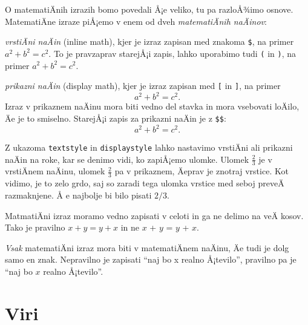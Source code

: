 \documentclass[a4paper]{article}
\begin{document}
O matematiÄnih izrazih bomo povedali Å¡e veliko, tu pa razloÅ¾imo osnove. MatematiÄne izraze
piÅ¡emo v enem od dveh \emph{matematiÄnih naÄinov}:
%
\begin{description}
\item \emph{vrstiÄni naÄin} (inline math), kjer je izraz zapisan med znakoma \texttt{\$}, na
  primer $a^2 + b^2 = c^2$. To je pravzaprav starejÅ¡i zapis, lahko uporabimo tudi
  \texttt{{}(} in \texttt{{})}, na primer \(a^2 + b^2 = c^2\).

\item \emph{prikazni naÄin} (display math), kjer je izraz zapisan med \texttt{{}[} in
  \texttt{{}]}, na primer
  \[
    a^2 + b^2 = c^2.
  \]
  Izraz v prikaznem naÄinu mora biti vedno del stavka in mora vsebovati loÄilo, Äe je to
  smiselno. StarejÅ¡i zapis za prikazni naÄin je z \texttt{\$\$}:
  $$
    a^2 + b^2 = c^2.
  $$
\end{description}

\noindent
%
Z ukazoma \texttt{{}textstyle} in \texttt{{}displaystyle} lahko nastavimo
vrstiÄni ali prikazni naÄin na roke, kar se denimo vidi, ko zapiÅ¡emo ulomke. Ulomek
$\frac{2}{3}$ je v vrstiÄnem naÄinu, ulomek $\displaystyle \frac{2}{3}$ pa v prikaznem,
Äeprav je znotraj vrstice. Kot vidimo, je to zelo grdo, saj so zaradi tega ulomka vrstice
med seboj preveÄ razmaknjene. Å e najbolje bi bilo pisati $2/3$.

MatmatiÄni izraz moramo vedno zapisati v celoti in ga ne delimo na veÄ kosov. Tako je
pravilno $x + y = y + x$ in ne $x$ + $y$ = $y$ + $x$.

\emph{Vsak} matematiÄni izraz mora biti v matematiÄnem naÄinu, Äe tudi je dolg samo en
znak. Nepravilno je zapisati ``naj bo x realno Å¡tevilo'', pravilno pa je ``naj bo $x$
realno Å¡tevilo''.


\section{Viri}
\end{document}
